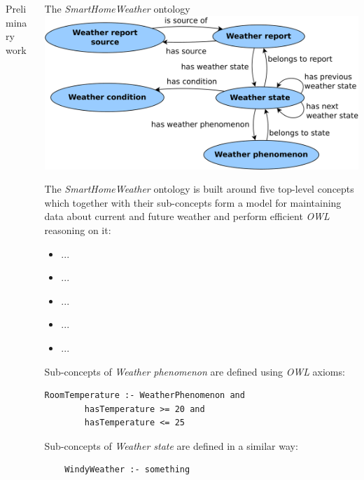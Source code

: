 \documentclass[final,hyperref={pdfpagelabels=true}]{beamer}
\begin{document}
\begin{frame}[fragile]
\begin{columns}[t]
\begin{column}{.45\textwidth}
      \begin{block}{Preliminary work}
	\lipsum[4]
      \end{block}
    \end{column}

    \begin{column}{.45\textwidth}
      \begin{block}{The \emph{SmartHomeWeather} ontology}
	\includegraphics[width=\textwidth]{figures/binary-relations.pdf}

	The \emph{SmartHomeWeather} ontology is built around five top-level concepts which together with their sub-concepts form a model for maintaining data about current and future weather and perform efficient \emph{OWL} reasoning on it:
	\begin{itemize}
          \item ...
          \item ...
          \item ...
          \item ...
          \item ...
	\end{itemize}

	Sub-concepts of \emph{Weather phenomenon} are defined using \emph{OWL} axioms:

	\begin{lstlisting}
RoomTemperature :- WeatherPhenomenon and
        hasTemperature >= 20 and
        hasTemperature <= 25
	\end{lstlisting}

	Sub-concepts of \emph{Weather state} are defined in a similar way:

	\begin{lstlisting}
	WindyWeather :- something
	\end{lstlisting}


\end{block}
\end{column}
\end{columns}
\end{frame}
\end{document}
